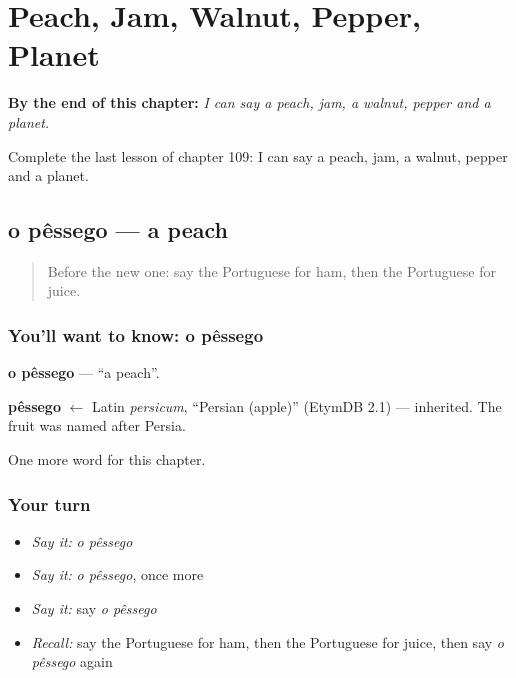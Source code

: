 
\chapter{Peach, Jam, Walnut, Pepper, Planet}
\label{ch:pt-peach-jam-walnut-pepper-planet}

\begin{chapteropening}
\textbf{By the end of this chapter:} \emph{I can say a peach, jam, a walnut, pepper and a planet.}

Complete the last lesson of chapter 109: I can say a peach, jam, a walnut, pepper and a planet.
\end{chapteropening}

\section[o pêssego]{o pêssego — a peach}

\label{lesson:PT-C109-pessego}



\begin{quote}
Before the new one: say the Portuguese for ham, then the Portuguese for juice.
\end{quote}

\subsection*{You'll want to know: o pêssego}
\textbf{o pêssego} — \textquotedblleft{}a peach\textquotedblright{}.

\begin{cousinweb}
\textbf{pêssego} $\leftarrow$ Latin \emph{persicum}, \textquotedblleft{}Persian (apple)\textquotedblright{} (EtymDB 2.1) — inherited. The fruit was named after Persia.
\end{cousinweb}

\begin{grammarlens}[title={What you've built}]
One more word for this chapter.
\end{grammarlens}

\subsection*{Your turn}
\begin{itemize}
\raggedright
  \item \emph{Say it:} \emph{o pêssego}
  \item \emph{Say it:} \emph{o pêssego}, once more
  \item \emph{Say it:} say \emph{o pêssego}
  \item \emph{Recall:} say the Portuguese for ham, then the Portuguese for juice, then say \emph{o pêssego} again
\end{itemize}

